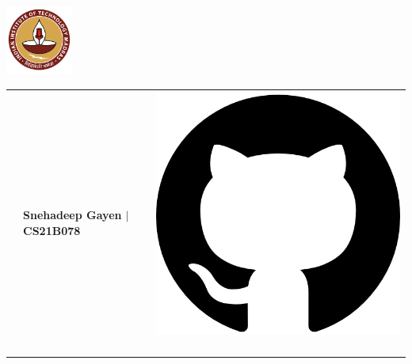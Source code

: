 \documentclass[article]{article}
\begin{document}
\vspace{-0.1cm}
\begin{minipage}{0\linewidth}
    \centering
    \includegraphics[height=0.9in]{Logo.png}
\end{minipage}
\begin{minipage}{0.9\linewidth}
    \setlength{\tabcolsep}{30pt}
    \begin{tabular}{l l l}
        & \textbf{\Large{Snehadeep Gayen $\vert$ CS21B078}} &
        \multirow{3}{*}{     {\href{https://github.com/Snehadeep-Gayen}{\includegraphics[scale=0.05]{github.png}} \ 
}}
\end{tabular}
\end{minipage}
\end{document}
